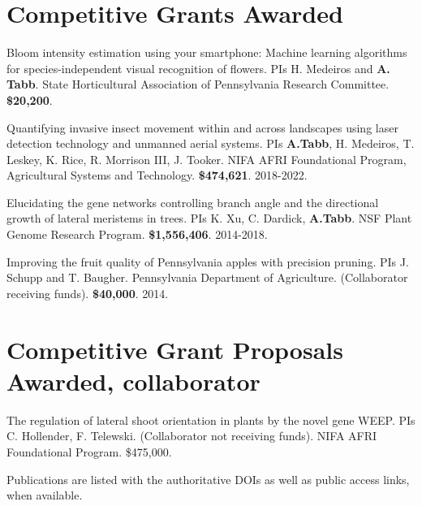 \documentclass[letterpaper,11pt]{article}
\begin{document}
\section{Competitive Grants Awarded}
\begin{enumerate}[noitemsep, leftmargin=*,label={[\arabic*]}]
\item{Bloom intensity estimation using your smartphone: Machine learning algorithms for species-independent visual recognition of flowers.  PIs H. Medeiros and \textbf{A. Tabb}.  State Horticultural Association of Pennsylvania Research Committee.  {\bf \$20,200}.}
\item{Quantifying invasive insect movement within and across landscapes using laser detection technology and unmanned aerial systems. PIs \textbf{A.Tabb}, H. Medeiros, T. Leskey, K. Rice, R. Morrison III, J. Tooker. NIFA AFRI Foundational Program, Agricultural Systems and Technology. {\bf\$474,621}. 2018-2022.}
\item{Elucidating the gene networks controlling branch angle and the directional growth of lateral meristems in trees.  PIs K. Xu, C. Dardick, \textbf{A.Tabb}. NSF Plant Genome Research Program. {\bf\$1,556,406}. 2014-2018.}
\item{Improving the fruit quality of Pennsylvania apples with precision pruning.  PIs J. Schupp and T. Baugher. Pennsylvania Department of Agriculture.  (Collaborator receiving funds). {\bf\$40,000}. 2014.}
\end{enumerate}

\section{\sc Competitive Grant Proposals Awarded, collaborator}
The regulation of lateral shoot orientation in plants by the novel gene WEEP. PIs C. Hollender, F. Telewski.  (Collaborator not receiving funds). NIFA AFRI Foundational Program. \$475,000.
\vspace*{0.2in}

Publications are listed with the authoritative DOIs as well as public access links, when available.
\end{document}
